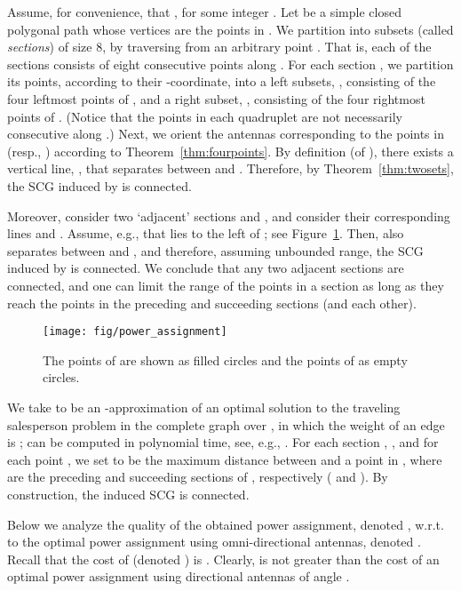 \documentclass[11pt,letter]{article}
\begin{document}
Assume, for convenience, that , for some integer .
Let  be a simple closed polygonal path whose vertices are the points in .
We partition  into subsets (called {\em sections}) of size 8, by traversing  from an arbitrary point . That is, each of the sections consists of eight consecutive points along .
For each section , we partition its points, according to their -coordinate, into a left subsets, , consisting of the four leftmost points of , and a right subset, , consisting of the four rightmost points of .
(Notice that the points in each quadruplet are not necessarily consecutive along .)
Next, we orient the antennas corresponding to the points in  (resp., ) according to Theorem~\ref{thm:fourpoints}.
By definition (of ), there exists a vertical line, , that separates between  and .
Therefore, by Theorem~\ref{thm:twosets}, the SCG induced by  is connected.

Moreover, consider two `adjacent' sections  and , and consider their corresponding lines  and .
Assume, e.g., that  lies to the left of ; see Figure~\ref{fig:power_assignment}. Then,  also separates between  and ,
and therefore, assuming unbounded range, the SCG induced by  is connected.
We conclude that any two adjacent sections are connected, and one can limit the range of the points in a section as long as they reach the points in the preceding and succeeding sections (and each other).


\begin{figure}[htp]
   \centering
       \texttt{[image: fig/power\_assignment]}
   \caption{The points of  are shown as filled circles and the points of  as empty circles.}
   \label{fig:power_assignment}
\end{figure}

We take  to be an -approximation of an optimal solution to the traveling salesperson problem in the complete graph
 over , in which the weight of an edge  is ;  can be computed in polynomial time, see, e.g., \cite{BC00,BNSWW10,FLNL08,A01}.
For each section , , and for each point , we set  to be the maximum distance between  and a point in ,
where  are the preceding and succeeding sections of , respectively ( and ).
By construction, the induced SCG is connected.

Below we analyze the quality of the obtained power assignment, denoted , w.r.t. to the optimal power assignment using omni-directional antennas, denoted . Recall that the cost of  (denoted ) is .
Clearly,  is not greater than the cost of an optimal power assignment using directional antennas of angle .
\end{document}
